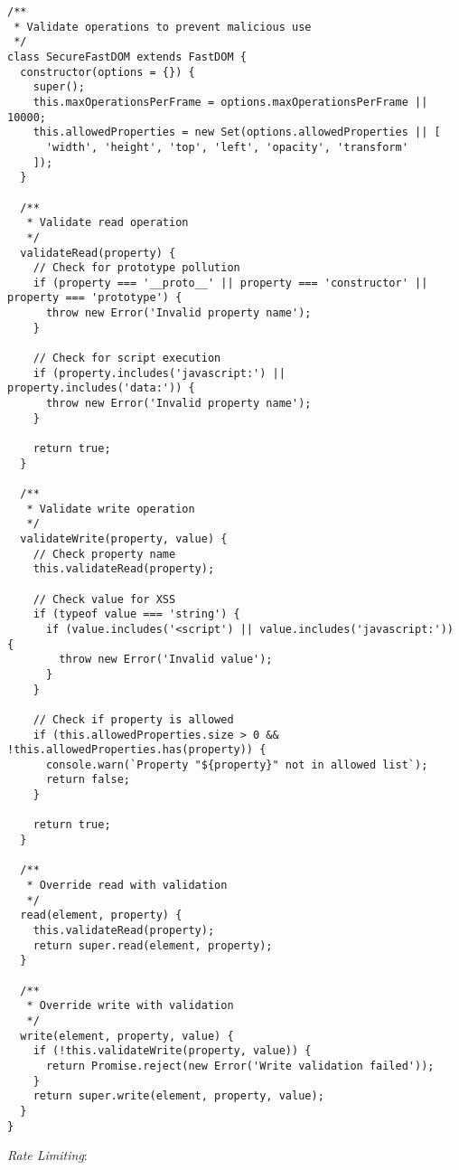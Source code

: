 \documentclass[11pt]{article}
\begin{document}
\begin{verbatim}
/**
 * Validate operations to prevent malicious use
 */
class SecureFastDOM extends FastDOM {
  constructor(options = {}) {
    super();
    this.maxOperationsPerFrame = options.maxOperationsPerFrame || 10000;
    this.allowedProperties = new Set(options.allowedProperties || [
      'width', 'height', 'top', 'left', 'opacity', 'transform'
    ]);
  }
  
  /**
   * Validate read operation
   */
  validateRead(property) {
    // Check for prototype pollution
    if (property === '__proto__' || property === 'constructor' || property === 'prototype') {
      throw new Error('Invalid property name');
    }
    
    // Check for script execution
    if (property.includes('javascript:') || property.includes('data:')) {
      throw new Error('Invalid property name');
    }
    
    return true;
  }
  
  /**
   * Validate write operation
   */
  validateWrite(property, value) {
    // Check property name
    this.validateRead(property);
    
    // Check value for XSS
    if (typeof value === 'string') {
      if (value.includes('<script') || value.includes('javascript:')) {
        throw new Error('Invalid value');
      }
    }
    
    // Check if property is allowed
    if (this.allowedProperties.size > 0 && !this.allowedProperties.has(property)) {
      console.warn(`Property "${property}" not in allowed list`);
      return false;
    }
    
    return true;
  }
  
  /**
   * Override read with validation
   */
  read(element, property) {
    this.validateRead(property);
    return super.read(element, property);
  }
  
  /**
   * Override write with validation
   */
  write(element, property, value) {
    if (!this.validateWrite(property, value)) {
      return Promise.reject(new Error('Write validation failed'));
    }
    return super.write(element, property, value);
  }
}
\end{verbatim}

\emph{Rate Limiting}:
\end{document}
